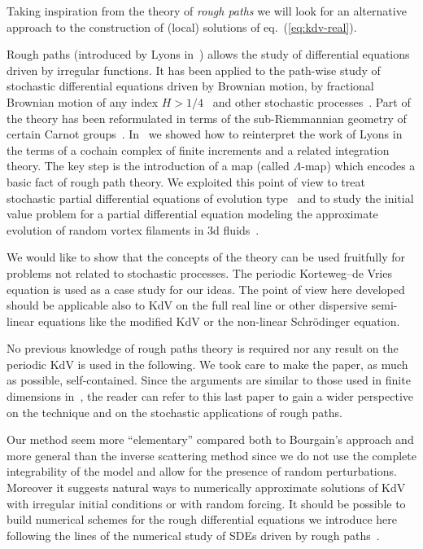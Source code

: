 \documentclass[a4paper,11pt,reqno]{article}
\begin{document}
Taking inspiration from the theory of \emph{rough paths} we will look for an alternative approach to the
construction of (local) solutions of eq.~(\ref{eq:kdv-real}).  

Rough paths (introduced by Lyons in~\cite{MR1654527,MR2036784}) allows the study of differential
equations driven by irregular functions. It has been applied to the
path-wise study of stochastic differential equations driven by
Brownian motion, by fractional Brownian motion of any index $H>1/4$~\cite{MR1883719}
and other stochastic processes~\cite{MR2164030,fvsubell}. Part of the theory has been reformulated in terms of the sub-Riemmannian geometry of certain Carnot groups~\cite{fvgeo}. 
In~\cite{MR2091358} we showed how to reinterpret the work of Lyons in the terms of a
cochain complex of finite increments and a related integration
theory. The key step is the introduction of a map (called
$\Lambda$-map) which encodes a basic fact of rough path theory.
We exploited this point of view 
 to treat stochastic partial differential
equations of evolution type~\cite{youngspde,TindelGubinelli} and to
study the initial value problem for a partial differential  equation
modeling the approximate evolution of random vortex filaments in 3d
fluids~\cite{evolution}. 

We would like to show that the concepts of the theory can be used
fruitfully for problems not related to stochastic processes.
The periodic Korteweg--de Vries equation is used as a case study for our
ideas. The point of view here developed should be applicable also to KdV on
the full  real line or other dispersive semi-linear equations like the
modified KdV or the non-linear Schr\"odinger equation.  

No previous knowledge of rough paths theory is required nor any
 result on the periodic KdV is used in the following. We took care to
make the paper, as much as possible, self-contained. Since the
arguments are similar to those used in finite dimensions
in~\cite{MR2091358},  the reader can refer to this last paper to gain a wider perspective
on the technique and on the stochastic applications of rough paths. 

Our method seem more ``elementary'' compared both to  Bourgain's approach and more general than the inverse scattering method since we do not use the complete integrability of the model and allow for the presence of random perturbations.
 Moreover it suggests natural ways to numerically approximate solutions of KdV with irregular initial conditions or with random forcing. It should be possible to build numerical schemes for the rough differential equations we introduce here following the lines of the numerical study of SDEs driven by rough paths~\cite{davie,MR1470933,fveuler}.
\end{document}
